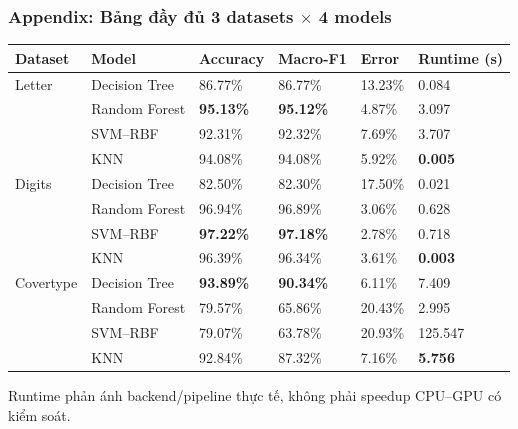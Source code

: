 \documentclass[aspectratio=169,12pt]{beamer}
\newif\ifappendixslides
\begin{document}
\appendix
\appendixslidestrue
\setcounter{framenumber}{0}

\begin{frame}
  \frametitle{Appendix: Bảng đầy đủ 3 datasets $\times$ 4 models}
  \scriptsize
  \begin{tabular}{@{}L{2.15cm}L{2.15cm}C{1.3cm}C{1.3cm}C{1.3cm}C{1.6cm}@{}}
    \toprule
    \textbf{Dataset} & \textbf{Model} & \textbf{Accuracy} & \textbf{Macro-F1} & \textbf{Error} & \textbf{Runtime (s)} \\
    \midrule
    Letter & Decision Tree & 86.77\% & 86.77\% & 13.23\% & 0.084 \\
           & Random Forest & \textbf{95.13\%} & \textbf{95.12\%} & 4.87\% & 3.097 \\
           & SVM--RBF & 92.31\% & 92.32\% & 7.69\% & 3.707 \\
           & KNN & 94.08\% & 94.08\% & 5.92\% & \textbf{0.005} \\
    \addlinespace
    Digits & Decision Tree & 82.50\% & 82.30\% & 17.50\% & 0.021 \\
           & Random Forest & 96.94\% & 96.89\% & 3.06\% & 0.628 \\
           & SVM--RBF & \textbf{97.22\%} & \textbf{97.18\%} & 2.78\% & 0.718 \\
           & KNN & 96.39\% & 96.34\% & 3.61\% & \textbf{0.003} \\
    \addlinespace
    Covertype & Decision Tree & \textbf{93.89\%} & \textbf{90.34\%} & 6.11\% & 7.409 \\
              & Random Forest & 79.57\% & 65.86\% & 20.43\% & 2.995 \\
              & SVM--RBF & 79.07\% & 63.78\% & 20.93\% & 125.547 \\
              & KNN & 92.84\% & 87.32\% & 7.16\% & \textbf{5.756} \\
    \bottomrule
  \end{tabular}
  \par\vspace{0.18cm}
  {\tiny Runtime phản ánh backend/pipeline thực tế, không phải speedup CPU--GPU có kiểm soát.}
\end{frame}
\end{document}
